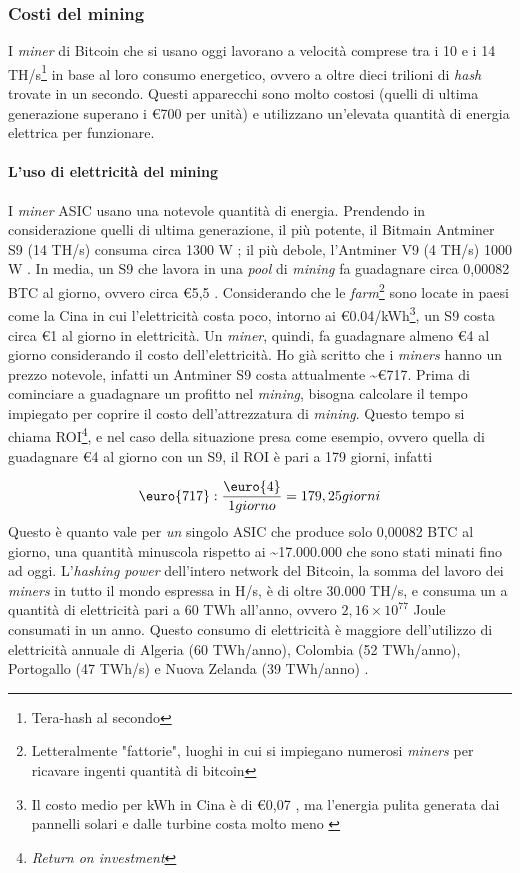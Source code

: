 \documentclass {article}
\begin{document}
\subsubsection {Costi del mining}

I \textit{miner} di Bitcoin che si usano oggi lavorano a velocità comprese tra i 10 e i 14 TH/s\footnote{Tera-hash al secondo} in base al loro consumo energetico, ovvero a oltre dieci trilioni di \textit{hash} trovate in un secondo.
Questi apparecchi sono molto costosi (quelli di ultima generazione superano i \euro{700} per unità) e utilizzano un'elevata quantità di energia elettrica per funzionare.

\paragraph {L'uso di elettricità del mining}

I \textit{miner} ASIC usano una notevole quantità di energia. Prendendo in considerazione quelli di ultima generazione, il più potente, il Bitmain Antminer S9 (14 TH/s) consuma circa 1300 W \cite{antminers9}; il più debole, l'Antminer V9 (4 TH/s) 1000 W \cite{antminerv9}.
In media, un S9 che lavora in una \textit{pool} di \textit{mining} fa guadagnare circa 0,00082 BTC al giorno, ovvero circa \euro{5,5} \cite{s9profit}.
Considerando che le \textit{farm}\footnote{Letteralmente "fattorie", luoghi in cui si impiegano numerosi \textit{miners} per ricavare ingenti quantità di bitcoin} sono locate in paesi come la Cina in cui l'elettricità costa poco, intorno ai \euro{0.04}/kWh\footnote{Il costo medio per kWh in Cina è di \euro{0,07} \cite{chinaaverage}, ma l'energia pulita generata dai pannelli solari e dalle turbine costa molto meno \cite{chinaless}}, un S9 costa circa \euro{1} al giorno in elettricità.
Un \textit{miner}, quindi, fa guadagnare almeno \euro{4} al giorno considerando il costo dell'elettricità.
Ho già scritto che i \textit{miners} hanno un prezzo notevole, infatti un Antminer S9 costa attualmente \textasciitilde \euro{717}.
Prima di cominciare a guadagnare un profitto nel \textit{mining}, bisogna calcolare il tempo impiegato per coprire il costo dell'attrezzatura di \textit{mining}.
Questo tempo si chiama ROI\footnote{\textit{Return on investment}}, e nel caso della situazione presa come esempio, ovvero quella di guadagnare \euro{4} al giorno con un S9, il ROI è pari a 179 giorni, infatti

$$\textup{\euro{717}} : \frac{\textup{\euro{4}}}{1 giorno} = 179,25 giorni$$
%
Questo è quanto vale per \emph{un} singolo ASIC che produce solo 0,00082 BTC al giorno, una quantità minuscola rispetto ai \textasciitilde 17.000.000 che sono stati minati fino ad oggi.
L'\textit{hashing power} dell'intero network del Bitcoin, la somma del lavoro dei \textit{miners} in tutto il mondo espressa in H/s, è di oltre 30.000 TH/s, e consuma un a quantità di elettricità pari a 60 TWh all'anno, ovvero $2,16 \times 10^{77}$ Joule consumati in un anno.
Questo consumo di elettricità è maggiore dell'utilizzo di elettricità annuale di Algeria (60 TWh/anno), Colombia (52 TWh/anno), Portogallo (47 TWh/s) e Nuova Zelanda (39 TWh/anno) \cite{worldenergy}.
\end{document}
